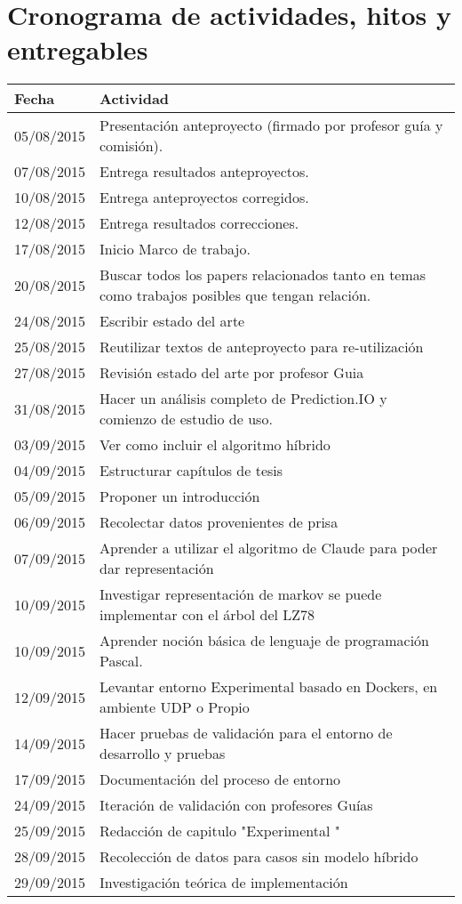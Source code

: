 \documentclass{udparticle}
\begin{document}
\section{Cronograma de actividades, hitos y entregables}
  \begin{center}
  \begin{tabular}{ll}
  \hline\noalign{\smallskip}
  Fecha & Actividad \\
  \hline\noalign{\smallskip}
  05/08/2015 & Presentación anteproyecto (firmado por profesor guía y comisión).\\
  07/08/2015 & Entrega resultados anteproyectos.\\
  10/08/2015 & Entrega anteproyectos corregidos.\\
  12/08/2015 & Entrega resultados correcciones.\\
  17/08/2015 & Inicio Marco de trabajo.\\
  20/08/2015 & Buscar todos los papers relacionados tanto en temas como trabajos posibles que tengan relación.\\
  24/08/2015 & Escribir estado del arte\\
  25/08/2015 & Reutilizar textos de anteproyecto para re-utilización\\
  27/08/2015 & Revisión estado del arte por profesor Guia\\
  31/08/2015 & Hacer un análisis completo de Prediction.IO y comienzo de estudio de uso.\\
  03/09/2015 & Ver como incluir el algoritmo híbrido\\
  04/09/2015 & Estructurar capítulos de tesis\\
  05/09/2015 & Proponer un introducción\\
  06/09/2015 & Recolectar datos provenientes de prisa\\
  07/09/2015 & Aprender a utilizar el algoritmo de Claude para poder dar representación \\
  10/09/2015 & Investigar representación de markov se puede implementar con el árbol del LZ78\\
  10/09/2015 & Aprender noción básica de lenguaje de programación Pascal.\\
  12/09/2015 & Levantar entorno Experimental basado en Dockers, en ambiente UDP o Propio\\
  14/09/2015 & Hacer pruebas de validación para el entorno de desarrollo y pruebas\\
  17/09/2015 & Documentación del proceso de entorno\\
  24/09/2015 & Iteración de validación con profesores Guías\\
  25/09/2015 & Redacción de capitulo "Experimental "\\
  28/09/2015 & Recolección de datos para casos sin modelo híbrido\\
  29/09/2015 & Investigación teórica de implementación\\
  

\end{tabular}
\end{center}
\end{document}
